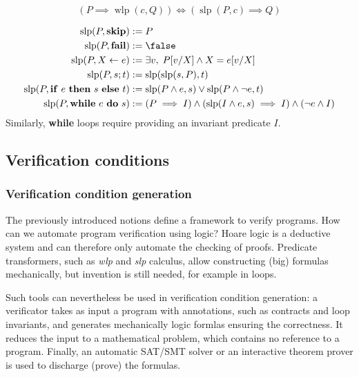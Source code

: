 \documentclass[toc, titlepaged]{../cs-classes/cs-classes}
\DeclareMathOperator{\wlp}{wlp}
\DeclareMathOperator{\slp}{slp}
\begin{document}
\begin{property}[Duality]
    \begin{equation*}
        (P\implies\wlp(c, Q)) \iff (\slp(P, c) \implies Q)
    \end{equation*}
\end{property}

\begin{definition}
    \begin{equation*}
        \begin{aligned}
            \slp(P, \textnormal{\bf skip}) &:= P\\
            \slp(P, \textnormal{\bf fail}) &:= \false\\
            \slp(P, X\leftarrow e) &:= \exists v, \; P[v/X] \land X=e[v/X]\\
            \slp(P, s;t) &:= \slp(\slp(s, P), t)\\
            \slp(P, \textnormal{\textbf{if} $e$ \textbf{then} $s$ \textbf{else} $t$}) &:= \slp(P\land e, s)\lor\slp(P\land\lnot e, t)\\
            \slp(P, \textnormal{\textbf{while} $e$ \textbf{do} $s$}) &:= (P\implies I)\land(\slp(I\land e, s) \implies I) \land (\lnot e\land I)
        \end{aligned}
    \end{equation*}
    Similarly, \textbf{while} loops require providing an invariant predicate $I$. 
\end{definition}

\subsection{Verification conditions}
\subsubsection{Verification condition generation}
The previously introduced notions define a framework to verify programs. How can we automate program verification using logic? Hoare logic is a deductive system and can therefore only automate the checking of proofs. Predicate transformers, such as \emph{wlp} and \emph{slp} calculus, allow constructing (big) formulas mechanically, but invention is still needed, for example in loops.

Such tools can nevertheless be used in verification condition generation: a verificator takes as input a program with annotations, such as contracts and loop invariants, and generates mechanically logic formlas ensuring the correctness. It reduces the input to a mathematical problem, which contains no reference to a program. Finally, an automatic SAT/SMT solver or an interactive theorem prover is used to discharge (prove) the formulas.
\end{document}
